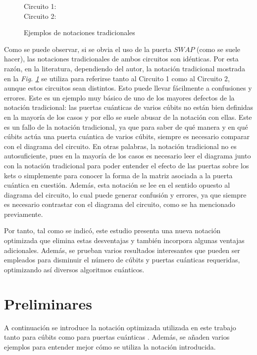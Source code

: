 \documentclass[10pt,conference,a4paper]{IEEEtran}
\begin{document}
 
\begin{figure}[htb!]
\begin{center}
    Circuito 1: \\
    \vspace{1mm}
    Circuito 2: \\
    \end{center}
    \caption{Ejemplos de notaciones tradicionales}
        \label{Fig2}
\end{figure}

Como se puede observar, si se obvia el uso de la puerta $SWAP$ (como se suele hacer), las notaciones tradicionales de ambos circuitos son idénticas. Por esta razón, en la literatura, dependiendo del autor, la notación tradicional mostrada en la \textit{Fig. \ref{Fig2}} se utiliza para referirse tanto al Circuito 1 como al Circuito 2, aunque estos circuitos sean distintos. Esto puede llevar fácilmente a confusiones y errores. Este es un ejemplo muy básico de uno de los mayores defectos de la notación tradicional: las puertas cuánticas de varios cúbits no están bien definidas en la mayoría de los casos y por ello se suele abusar de la notación con ellas. Este es un fallo de la notación tradicional, ya que para saber de qué manera y en qué cúbits actúa una puerta cuántica de varios cúbits, siempre es necesario comparar con el diagrama del circuito. En otras palabras, la notación tradicional no es autosuficiente, pues en la mayoría de los casos es necesario leer el diagrama junto con la notación tradicional para poder entender el efecto de las puertas sobre los kets o simplemente para conocer la forma de la matriz asociada a la puerta cuántica en cuestión. Además, esta notación se lee en el sentido opuesto al diagrama del circuito, lo cual puede generar confusión y errores, ya que siempre es necesario contrastar con el diagrama del circuito, como se ha mencionado previamente.

Por  tanto, tal como se indicó, este estudio presenta una nueva notación optimizada que elimina estas desventajas y también incorpora algunas ventajas adicionales. Además, se prueban varios resultados interesantes que pueden ser empleados para disminuir el número de cúbits y puertas cuánticas requeridas, optimizando así diversos algoritmos cuánticos.


\section{Preliminares}
\label{seccion:3}
A continuación se introduce la notación optimizada utilizada en este trabajo tanto para cúbits como para puertas cuánticas \cite{JNIC}. Además, se añaden varios ejemplos para entender mejor cómo se utiliza  la notación introducida.
\end{document}
